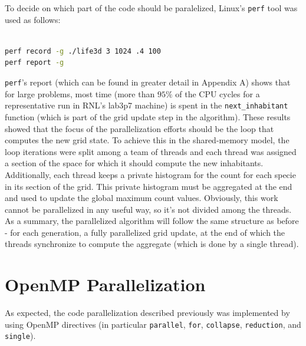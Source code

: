 \documentclass{article}
\begin{document}
To decide on which part of the code should be paralelized, Linux's \texttt{perf}
tool was used as follows:

\begin{lstlisting}[language=bash,caption={Example usage of \texttt{perf} to identify
serial performance bottleneck}]

perf record -g ./life3d 3 1024 .4 100
perf report -g

\end{lstlisting}

\texttt{perf}'s report (which can be found in greater detail in Appendix A) shows
that for large problems, most time (more than $95\%$ of the CPU cycles for a
representative run in RNL's lab3p7 machine) is spent in the \texttt{next\_inhabitant}
function (which is part of the grid update step in the algorithm). These results
showed that the focus of the parallelization efforts should be the loop that
computes the new grid state. To achieve this in the
shared-memory model, the loop iterations were split among a team of
threads and each thread was assigned a section of the space for which it should compute the
new inhabitants. Additionally, each thread keeps a private histogram for the count for each
specie in its section of the grid. This private histogram must be aggregated
at the end and used to update the global maximum count values. Obviously, this
work cannot be parallelized in any useful way, so it's not divided among the threads.
As a summary, the parallelized algorithm will follow the same structure as before
- for each generation, a fully parallelized grid update, at the end of which
the threads synchronize to compute the aggregate (which is done by a single thread).



\section{OpenMP Parallelization}

As expected, the code parallelization described previously was implemented
by using OpenMP directives (in particular \texttt{parallel}, \texttt{for}, \texttt{collapse}, 
\texttt{reduction}, and \texttt{single}).
\end{document}
